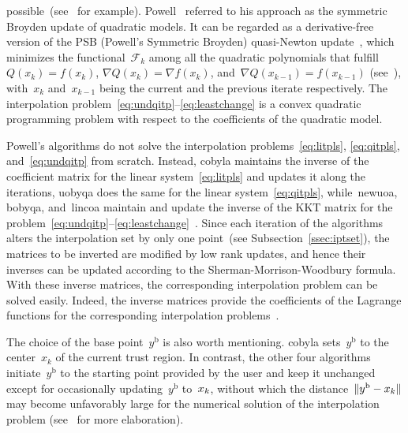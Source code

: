 \documentclass[11pt,draft]{article}
\numberwithin{equation}{section}
\newcommand{\base}{{\text{b}}}
\newcommand{\func}{\mathcal{F}}
\newcommand{\iter}[1][k]{x\ifthenelse{\equal{#1}{}}{}{_{#1}}}
\begin{document}
possible~(see~\cite{Conn_Toint_1996,Bandeira_Scheinberg_Vicente_2012,Powell_2013,Zhang_2014} for example).
Powell~\cite{Powell_2013} referred to his approach as the symmetric Broyden update of
quadratic models. It can be regarded as a derivative-free version of the
PSB (Powell's Symmetric Broyden) quasi-Newton update~\cite{Powell_1970b}, which minimizes the
functional~$\func_k$ among all the quadratic polynomials that fulfill~$Q(x_k) = f(x_k)$, $\nabla Q(x_k)
= \nabla f(x_k)$, and~$\nabla Q(x_{k-1}) = f(x_{k-1})$ (see~\cite[Theorem~4.2]{Dennis_Schnabel_1979}),
with~$x_{k}$ and~$x_{k-1}$ being the current and the previous iterate respectively.
The interpolation problem~\eqref{eq:undqitp}--\eqref{eq:leastchange} is
a convex quadratic programming problem with respect to the coefficients of the quadratic model.

Powell's algorithms do not solve the interpolation problems~\eqref{eq:litpls},
\eqref{eq:qitpls}, and~\eqref{eq:undqitp} from scratch. Instead, \gls{cobyla} maintains the inverse
of the coefficient matrix for the linear system~\eqref{eq:litpls} and updates it along the iterations,
\gls{uobyqa} does the same for the linear system~\eqref{eq:qitpls}, while~\gls{newuoa},
\gls{bobyqa}, and~\gls{lincoa} maintain and update the inverse of the KKT matrix
for the problem~\eqref{eq:undqitp}--\eqref{eq:leastchange}~\cite{Powell_2004b}. Since each iteration of the algorithms alters the
interpolation set by only one point~(see Subsection~\ref{ssec:iptset}), the matrices to be inverted
are modified by low rank updates, and hence their inverses can be updated according to the
Sherman-Morrison-Woodbury formula.
With these inverse matrices, the corresponding interpolation problem can be solved easily.
Indeed, the inverse matrices provide the coefficients of the Lagrange functions for the
corresponding interpolation problems~\cite{Powell_2001,Powell_2004a}.

The choice of the base point~$y^{\base}$ is also worth mentioning.
\gls{cobyla} sets~$y^{\base}$ to the center~$x_k$ of the current trust region.
In contrast, the other four algorithms initiate~$y^{\base}$ to the starting point provided by the
user and keep it unchanged except for occasionally
updating~$y^{\base}$ to~$\iter$, without which the distance~$\|y^{\base}-\iter\|$ may become unfavorably
large for the numerical solution of the interpolation problem (see~\cite[Section~5]{Powell_2004a} for more
elaboration).
\end{document}
